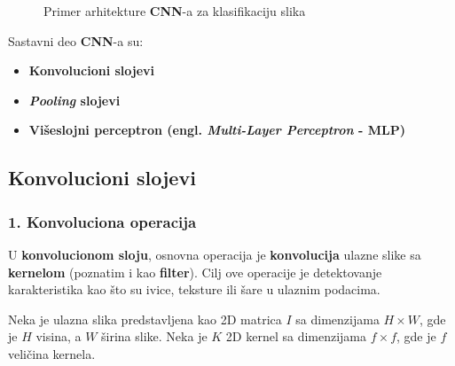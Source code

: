 \documentclass[12pt]{article}
\begin{document}
     \begin{figure}[h!]
      \centering
      \caption{Primer arhitekture \textbf{CNN}-a za klasifikaciju slika}
      \label{fig:cnn_architecture}
    \end{figure}
    
    \vspace{0.7cm}
   
    Sastavni deo \textbf{CNN}-a su:
    \begin{itemize}
      \vspace{-0.5cm}
      \setlength\itemsep{0em}
      \item \textbf{Konvolucioni slojevi}
      \item \textbf{\textit{Pooling} slojevi}
      \item \textbf{Višeslojni perceptron (engl. \textbf{\textit{Multi-Layer Perceptron}} - \textbf{MLP})}
   \end{itemize}

   \newpage

   \subsection*{Konvolucioni slojevi}
   \subsubsection*{1. Konvoluciona operacija}
   U \textbf{konvolucionom sloju}, osnovna operacija je \textbf{konvolucija} ulazne slike sa \textbf{kernelom} (poznatim i kao \textbf{filter}).
   Cilj ove operacije je detektovanje karakteristika kao što su ivice, teksture 
   ili šare u ulaznim podacima.

   Neka je ulazna slika predstavljena kao 2D matrica \( I \) 
   sa dimenzijama \( H \times W \), gde je \( H \) visina, 
   a \( W \) širina slike. Neka je \( K \) 2D kernel sa 
   dimenzijama \( f \times f \), gde je \( f \) veličina kernela.
   
\end{document}
